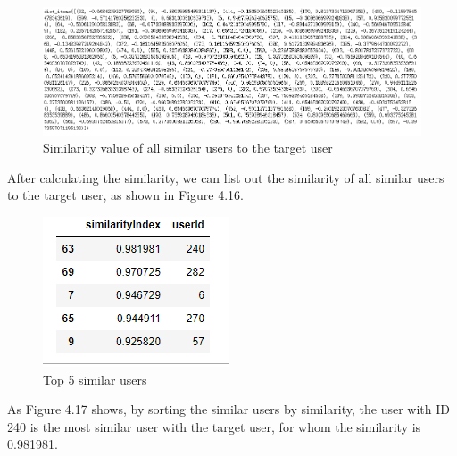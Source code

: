 \begin{figure}
    \centering
    \includegraphics[scale=0.6]{figure/cf7.png}
    \caption{Similarity value of all similar users to the target user}
\end{figure}
After calculating the similarity, we can list out the similarity of all similar users to the target user, as shown in Figure 4.16.
\begin{figure}
    \centering
    \includegraphics[scale=1]{figure/taegetcf3.png}
    \caption{Top 5 similar users }
\end{figure}
As Figure 4.17 shows, by sorting the similar users by similarity, the user with ID 240 is the most similar user with the target user, for whom the similarity is 0.981981.

